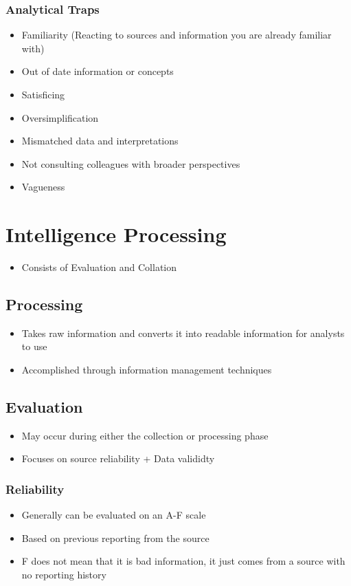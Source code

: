 \documentclass[11pt]{article}
\begin{document}
\subsubsection{Analytical Traps}
\label{sec:org06dd68e}
\begin{itemize}
\item Familiarity (Reacting to sources and information you are already familiar with)
\item Out of date information or concepts
\item Satisficing
\item Oversimplification
\item Mismatched data and interpretations
\item Not consulting colleagues with broader perspectives
\item Vagueness
\end{itemize}
\section{Intelligence Processing}
\label{sec:orgf720deb}
\begin{itemize}
\item Consists of Evaluation and Collation
\end{itemize}
\subsection{Processing}
\label{sec:orgb4e6b60}
\begin{itemize}
\item Takes raw information and converts it into readable information for analysts to use
\item Accomplished through information management techniques
\end{itemize}
\subsection{Evaluation}
\label{sec:orgbcbe820}
\begin{itemize}
\item May occur during either the collection or processing phase
\item Focuses on source reliability + Data valididty
\end{itemize}
\subsubsection{Reliability}
\label{sec:orgaf0ac91}
\begin{itemize}
\item Generally can be evaluated on an A-F scale
\item Based on previous reporting from the source
\item F does not mean that it is bad information, it just comes from a source with no reporting history
\end{itemize}
\end{document}
